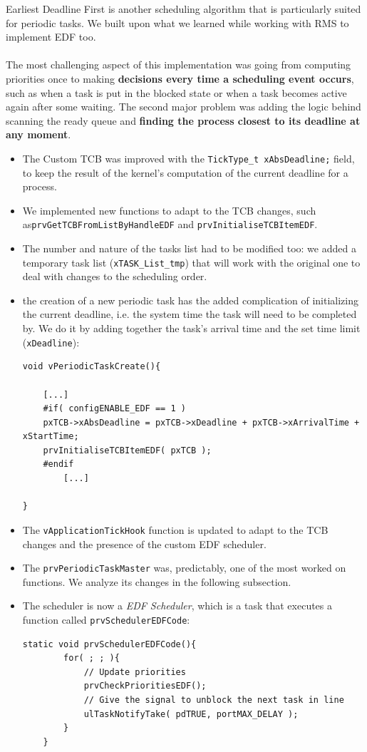 \documentclass[10pt]{article}
\begin{document}
Earliest Deadline First is another scheduling algorithm that is particularly suited for periodic tasks. We built upon what we learned while working with RMS to implement EDF too.
\\\\
The most challenging aspect of this implementation was going from computing priorities once to making \textbf{decisions every time a scheduling event occurs}, such as when a task is put in the blocked state or when a task becomes active again after some waiting.
The second major problem was adding the logic behind scanning the ready queue and \textbf{finding the process closest to its deadline at any moment}.
\\
\begin{itemize}
\item The Custom TCB was improved with the \verb|TickType_t xAbsDeadline;| field, to keep the result of the kernel's computation of the current deadline for a process.
\item We implemented new functions to adapt to the TCB changes, such as\verb|prvGetTCBFromListByHandleEDF| and \verb|prvInitialiseTCBItemEDF|.
\item The number and nature of the tasks list had to be modified too: we added a temporary task list (\verb|xTASK_List_tmp|) that will work with the original one to deal with changes to the scheduling order.
\item the creation of a new periodic task has the added complication of initializing the current deadline, i.e. the system time the task will need to be completed by. We do it by adding together the task's arrival time and the set time limit (\verb|xDeadline|):
\lstset{language=c}
\begin{lstlisting}
void vPeriodicTaskCreate(){

    [...]
    #if( configENABLE_EDF == 1 )
    pxTCB->xAbsDeadline = pxTCB->xDeadline + pxTCB->xArrivalTime + xStartTime;
    prvInitialiseTCBItemEDF( pxTCB );
    #endif
		[...]

}
\end{lstlisting}
\item The \verb|vApplicationTickHook| function is updated to adapt to the TCB changes and the presence of the custom EDF scheduler. 
\item The \verb|prvPeriodicTaskMaster| was, predictably, one of the most worked on functions. We analyze its changes in the following subsection.
\item The scheduler is now a \textit{EDF Scheduler}, which is a task that executes a function called \verb|prvSchedulerEDFCode|:
\begin{lstlisting}
static void prvSchedulerEDFCode(){
        for( ; ; ){
        	// Update priorities
            prvCheckPrioritiesEDF();
            // Give the signal to unblock the next task in line
            ulTaskNotifyTake( pdTRUE, portMAX_DELAY );
        }
    }
\end{lstlisting}
\end{itemize}
\end{document}
